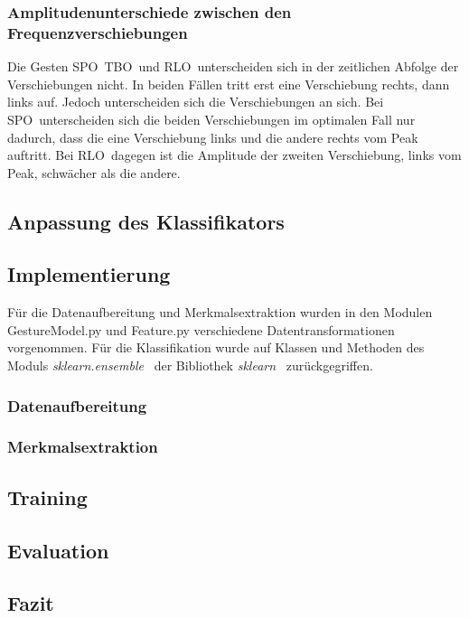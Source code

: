 \subsubsection*{Amplitudenunterschiede zwischen den Frequenzverschiebungen}
Die Gesten \glqq \acl{SPO}\grqq\, \glqq \acl{TBO}\grqq\ und \glqq \acl{RLO}\grqq\ unterscheiden sich in der zeitlichen Abfolge der Verschiebungen nicht. In beiden Fällen tritt erst eine Verschiebung rechts, dann links auf. Jedoch unterscheiden sich die Verschiebungen an sich. Bei \glqq \acl{SPO}\grqq\ unterscheiden sich die beiden Verschiebungen im optimalen Fall nur dadurch, dass die eine Verschiebung links und die andere rechts vom Peak auftritt. Bei \glqq \acl{RLO}\grqq\ dagegen ist die Amplitude der zweiten Verschiebung, links vom Peak, schwächer als die andere.

\subsection{Anpassung des Klassifikators}

\subsection{Implementierung}

Für die Datenaufbereitung und Merkmalsextraktion wurden in den Modulen GestureModel.py und Feature.py verschiedene Datentransformationen vorgenommen. Für die Klassifikation wurde auf Klassen und Methoden des Moduls \textit{sklearn.ensemble}~\cite{sklearn.ensemble} der Bibliothek \textit{sklearn}~\cite{sklearn} zurückgegriffen.

\subsubsection{Datenaufbereitung}


\subsubsection{Merkmalsextraktion}

\subsection{Training}

\subsection{Evaluation}

\subsection{Fazit}


